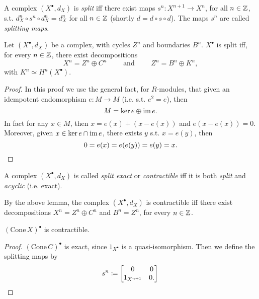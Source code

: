 \begin{defn}
	A complex $\left( X^{\bullet}, d_{X} \right)$ is {\em split} iff there exist
	maps $s^n\colon X^{n+1} \to X^n$, for all $n \in \mathbb{Z}$, s.t.
	$d^n_X \circ s^n \circ d^n_X = d^n_X$ for all $n \in \mathbb{Z}$ (shortly $d = d \circ s \circ d$).
	The maps $s^n$ are called {\em splitting maps}.
\end{defn}

\begin{lem}
	Let $\left( X^{\bullet}, d_{X} \right)$ be a complex, with cycles $Z^n$ and
	boundaries $B^n$.
	$X^\bullet$ is split iff, for every $n \in \mathbb{Z}$, there
	exist decompositions
	\begin{equation}
	X^n = Z^n \oplus C^n \qquad \text{ and } \qquad
	Z^n = B^n \oplus K^n
	,\end{equation} 
	with $K^n \simeq H^n(X^\bullet)$.
\end{lem} 
\begin{proof}
	In this proof we use the general fact, for $R$-modules, that given an idempotent
	endomorphism $e\colon M \to M$ (i.e. s.t. $e^2 = e$), then
	\begin{equation}
	M = \ker e \oplus \operatorname{im} e
	.\end{equation} 
	In fact for any $x \in M$, then $x = e(x) + (x - e(x))$ and
	$e(x - e(x)) = 0$.
	Moreover, given $x \in \ker e \cap \operatorname{im} e$, there exists $y$ s.t. $x = e(y)$, then
	\begin{equation*}
		0 = e(x) = e(e(y)) = e(y) = x.\qedhere
	\end{equation*} 
\end{proof}

\begin{defn}
	A complex $\left( X^{\bullet}, d_{X} \right)$ is called {\em split exact} or {\em contractible} iff
	it is both {\em split} and {\em acyclic} (i.e. exact).
\end{defn}

\begin{rem}[]
	By the above lemma, the complex $\left( X^{\bullet}, d_{X} \right)$ is contractible iff
	there exist decompositions $X^n = Z^n \oplus C^n$ and $B^n = Z^n$, for every $n \in \mathbb{Z}$.
\end{rem}

\begin{lem}
	$(\mathrm{Cone}\, X)^\bullet$ is contractible.
\end{lem} 
\begin{proof}
	$\left( \mathrm{Cone}\, C \right)^\bullet$ is exact, since $1_{X^\bullet}$ is a quasi-isomorphism.
	Then we define the splitting maps by
	\begin{equation*}
	s^n \coloneqq
	\begin{bmatrix}
		0 & 0\\
		1_{X^{n+1}} & 0.
	\end{bmatrix} \qedhere
	\end{equation*} 
\end{proof}

